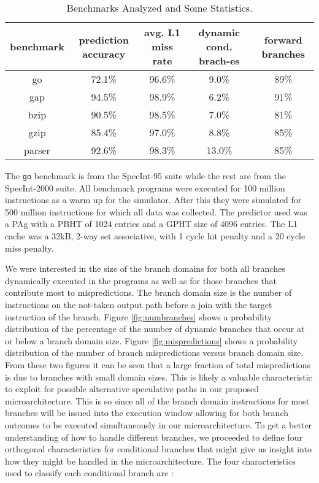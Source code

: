 \documentclass[10pt,dvips]{article}
\begin{document}
\begin{table}
\begin{center}
\caption{Benchmarks Analyzed and Some Statistics.}\label{tab:benches}
\begin{tabular}{|c|c|c|c|c|}
\hline 
benchmark&
prediction accuracy&
avg. L1 miss rate&
dynamic cond. brach-es & forward branches\\
\hline
\hline 
go&
72.1\%&
96.6\%&
9.0\% & 89\%\\
\hline 
gap&
94.5\%&
98.9\%&
6.2\% & 91\%\\
\hline 
bzip&
90.5\%&
98.5\%&
7.0\%&81\%\\
\hline 
gzip&
85.4\%&
97.0\%&
8.8\%&85\%\\
\hline 
parser&
92.6\%&
98.3\%&
13.0\%&85\%\\
\hline
\end{tabular}
\end{center}
\end{table}

The {\tt go} benchmark is from the SpecInt-95 suite while the rest
are from the SpecInt-2000 suite.
All benchmark programs were executed for 100 million instructions
as a warm up for the simulator.  After this they were simulated
for 500 million instructions for which all data was collected.
The predictor used was a PAg with
a PBHT of 1024 entries and a GPHT size of 4096 entries.
The L1 cache was a 32kB, 2-way set associative, with 1 cycle hit
penalty and a 20 cycle miss penalty.

We were interested
in the size of the branch domains for both all branches
dynamically executed in the programs as well as for those branches 
that contribute most to mispredictions.  The branch domain size
is the number of instructions on the not-taken output path
before a join with the target instruction of the branch.
Figure \ref{fig:numbranches} shows a probability distribution of
the percentage of the number of dynamic branches that occur at
or below a branch domain size.  
Figure \ref{fig:mispredictions} shows a probability distribution of
the number of branch mispredictions versus
branch domain size.
From these two figures it can be seen 
that a large fraction of total mispredictions 
is due to branches with small domain
sizes. 
This is likely a valuable characteristic to exploit for
possible alternative speculative paths in our proposed
microarchitecture.  This is so since all of the branch domain
instructions for most
branches will be issued into the execution window allowing
for both branch outcomes to be executed simultaneously
in our microarchitecture.
To get a better understanding of how to handle different branches,
we proceeded to define four orthogonal characteristics
for conditional branches that might give us insight into
how they might be handled in the microarchitecture.
The four characteristics used to classify each conditional branch are :
\end{document}
